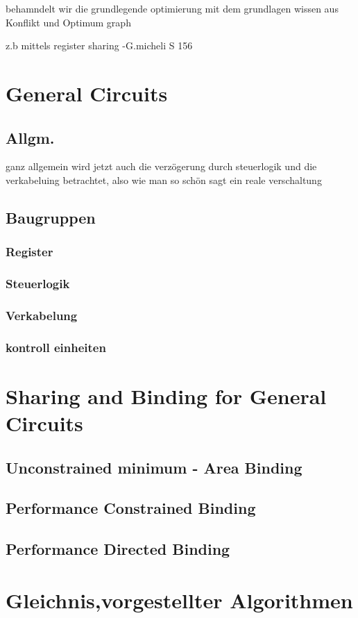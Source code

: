\documentclass[conference]{IEEEtran}
\begin{document}
behamndelt wir die grundlegende optimierung mit dem grundlagen wissen aus Konflikt und Optimum graph 

z.b mittels register sharing
-G.micheli S 156 
\section{General Circuits}
\subsection{Allgm.}

ganz allgemein wird jetzt auch die verzögerung durch steuerlogik und die verkabeluing betrachtet, also wie man so schön sagt ein reale verschaltung
\subsection{Baugruppen}
 \subsubsection{Register}
 \subsubsection{Steuerlogik}
 \subsubsection{Verkabelung}
 \subsubsection{kontroll einheiten}
\section{Sharing and Binding for General Circuits}
\subsection{Unconstrained minimum - Area Binding}
\subsection{Performance Constrained Binding}
\subsection{Performance Directed Binding}
\section{Gleichnis,vorgestellter Algorithmen}
\end{document}
